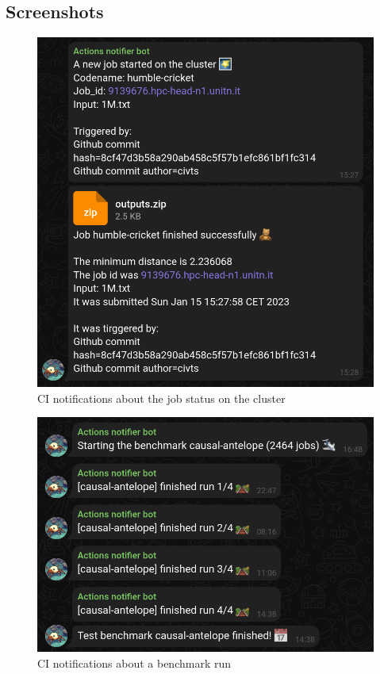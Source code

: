 \subsection{Screenshots}

\begin{figure}[!ht]
      \centering
      \includegraphics[width=0.4\columnwidth]{../assets/images/ci_notification.png}
      \caption{CI notifications about the job status on the cluster}
\end{figure}

\begin{figure}[!ht]
      \centering
      \includegraphics[width=0.4\columnwidth]{../assets/images/benchmark_notifications.png}
      \caption{CI notifications about a benchmark run}
\end{figure}

